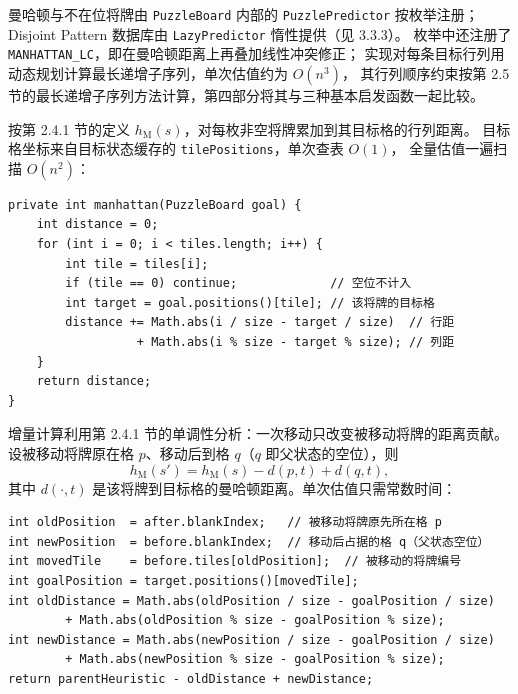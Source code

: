 曼哈顿与不在位将牌由 \texttt{PuzzleBoard} 内部的 \texttt{PuzzlePredictor}
按枚举注册；Disjoint Pattern 数据库由 \texttt{LazyPredictor} 惰性提供（见 3.3.3）。
枚举中还注册了 \texttt{MANHATTAN\_LC}，即在曼哈顿距离上再叠加线性冲突修正；
实现对每条目标行列用动态规划计算最长递增子序列，单次估值约为 $O(n^3)$，
其行列顺序约束按第 2.5 节的最长递增子序列方法计算，第四部分将其与三种基本启发函数一起比较。

\par\vspace{2bp}

按第 2.4.1 节的定义 $h_{\mathrm{M}}(s)$，对每枚非空将牌累加到其目标格的行列距离。
目标格坐标来自目标状态缓存的 \texttt{tilePositions}，单次查表 $O(1)$，
全量估值一遍扫描 $O(n^2)$：

{\fontsize{9.5bp}{12bp}\selectfont
\noindent\begin{minipage}{\linewidth}
\begin{verbatim}
private int manhattan(PuzzleBoard goal) {
    int distance = 0;
    for (int i = 0; i < tiles.length; i++) {
        int tile = tiles[i];
        if (tile == 0) continue;             // 空位不计入
        int target = goal.positions()[tile]; // 该将牌的目标格
        distance += Math.abs(i / size - target / size)  // 行距
                  + Math.abs(i % size - target % size); // 列距
    }
    return distance;
}
\end{verbatim}
\end{minipage}}

增量计算利用第 2.4.1 节的单调性分析：一次移动只改变被移动将牌的距离贡献。
设被移动将牌原在格 $p$、移动后到格 $q$（$q$ 即父状态的空位），则
\[
h_{\mathrm{M}}(s')=h_{\mathrm{M}}(s)-d(p,t)+d(q,t),
\]
其中 $d(\cdot,t)$ 是该将牌到目标格的曼哈顿距离。单次估值只需常数时间：

\par\noindent\begin{minipage}{\linewidth}
\vspace{2bp}
{\fontsize{9.5bp}{12bp}\selectfont
\noindent\begin{minipage}{\linewidth}
\begin{verbatim}
int oldPosition  = after.blankIndex;   // 被移动将牌原先所在格 p
int newPosition  = before.blankIndex;  // 移动后占据的格 q（父状态空位）
int movedTile    = before.tiles[oldPosition];  // 被移动的将牌编号
int goalPosition = target.positions()[movedTile];
int oldDistance = Math.abs(oldPosition / size - goalPosition / size)
        + Math.abs(oldPosition % size - goalPosition % size);
int newDistance = Math.abs(newPosition / size - goalPosition / size)
        + Math.abs(newPosition % size - goalPosition % size);
return parentHeuristic - oldDistance + newDistance;
\end{verbatim}
\end{minipage}}
\end{minipage}\par

